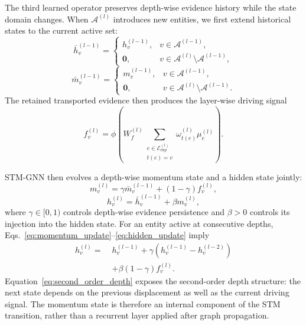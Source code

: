 \documentclass[a4paper,fleqn]{cas-sc}
\begin{document}
The third learned operator preserves depth-wise evidence history while the state
domain changes. When $\mathcal{A}^{(l)}$ introduces new entities, we first
extend historical states to the current active set:
\begin{equation}
\bar h_v^{(l-1)}
=
\begin{cases}
h_v^{(l-1)}, & v\in\mathcal{A}^{(l-1)},\\
\mathbf{0}, & v\in\mathcal{A}^{(l)}\setminus\mathcal{A}^{(l-1)},
\end{cases}
\end{equation}
\begin{equation}
\bar m_v^{(l-1)}
=
\begin{cases}
m_v^{(l-1)}, & v\in\mathcal{A}^{(l-1)},\\
\mathbf{0}, & v\in\mathcal{A}^{(l)}\setminus\mathcal{A}^{(l-1)}.
\end{cases}
\end{equation}
The retained transported evidence then produces the layer-wise driving signal
\begin{equation}
f_v^{(l)}
=
\phi\!\left(
W_f^{(l)}
\sum_{\substack{e\in\mathcal{E}_{\mathrm{exp}}^{(l)}\\t(e)=v}}
\omega_{t(e)}^{(l)}\mu_e^{(l)}
\right).
\label{eq:driving_signal}
\end{equation}

STM-GNN then evolves a depth-wise momentum state and a hidden state jointly:
\begin{equation}
m_v^{(l)}
=
\gamma\bar m_v^{(l-1)}+(1-\gamma)f_v^{(l)},
\label{eq:momentum_update}
\end{equation}
\begin{equation}
h_v^{(l)}
=
\bar h_v^{(l-1)}+\beta m_v^{(l)},
\label{eq:hidden_update}
\end{equation}
where $\gamma\in[0,1)$ controls depth-wise evidence persistence and $\beta>0$
controls its injection into the hidden state. For an entity active at consecutive
depths, Eqs.~\eqref{eq:momentum_update}--\eqref{eq:hidden_update} imply
\begin{equation}
\begin{aligned}
h_v^{(l)}
=\;&h_v^{(l-1)}
+\gamma\left(h_v^{(l-1)}-h_v^{(l-2)}\right)\\
&+\beta(1-\gamma)f_v^{(l)}.
\end{aligned}
\label{eq:second_order_depth}
\end{equation}
Equation~\eqref{eq:second_order_depth} exposes the second-order depth structure:
the next state depends on the previous displacement as well as the current
driving signal. The momentum state is therefore an internal component of the
STM transition, rather than a recurrent layer applied after graph propagation.
\end{document}
